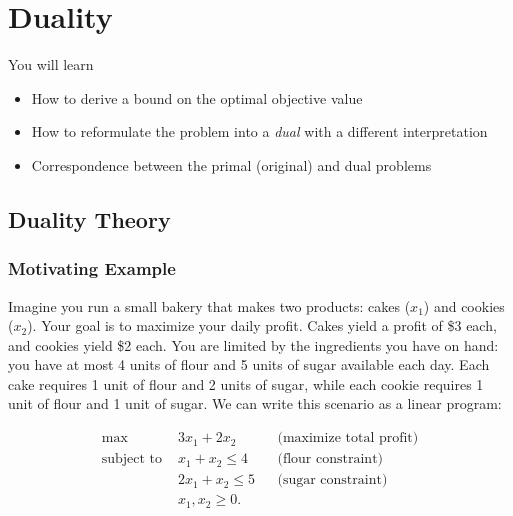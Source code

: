 

\chapter{Duality}
\begin{outcome}
You will learn
\begin{itemize}
\item How to derive a bound on the optimal objective value
\item How to reformulate the problem into a \emph{dual} with a different interpretation
\item Correspondence between the primal (original) and dual problems
\end{itemize}
\end{outcome}

\section{Duality Theory}

\subsection*{Motivating Example}

Imagine you run a small bakery that makes two products: cakes ($x_1$) and cookies ($x_2$). Your goal is to maximize your daily profit. Cakes yield a profit of \$3 each, and cookies yield \$2 each. You are limited by the ingredients you have on hand: you have at most 4 units of flour and 5 units of sugar available each day. Each cake requires 1 unit of flour and 2 units of sugar, while each cookie requires 1 unit of flour and 1 unit of sugar. We can write this scenario as a linear program:

\[
\begin{aligned}
\max \; & 3x_1 + 2x_2 && \text{(maximize total profit)}\\
\text{subject to } & x_1 + x_2 \leq 4 && \text{(flour constraint)}\\
& 2x_1 + x_2 \leq 5 && \text{(sugar constraint)}\\
& x_1, x_2 \geq 0.
\end{aligned}
\]

